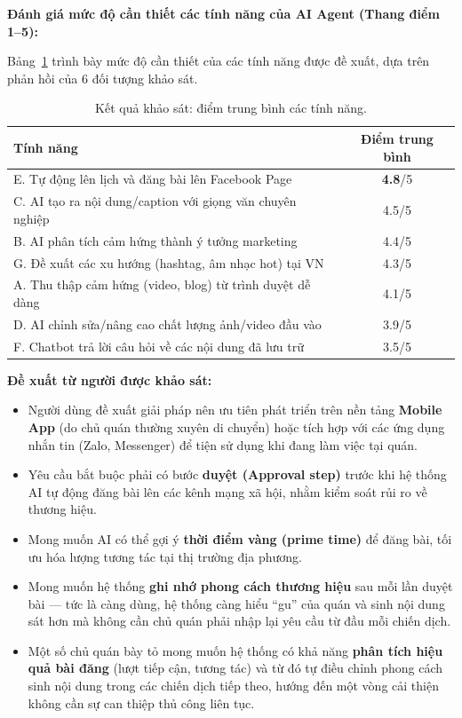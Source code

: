 \textbf{Đánh giá mức độ cần thiết các tính năng của AI Agent (Thang điểm
1--5):}

Bảng~\ref{tab:ket-qua-khao-sat} trình bày mức độ cần thiết của các tính
năng được đề xuất, dựa trên phản hồi của 6 đối tượng khảo sát.

\begin{table}[htbp]
\centering
\caption{Kết quả khảo sát: điểm trung bình các tính năng.}
\label{tab:ket-qua-khao-sat}
\small
\begin{tabular}{p{9.2cm} c}
\toprule
\textbf{Tính năng} & \textbf{Điểm trung bình} \\
\midrule
E. Tự động lên lịch và đăng bài lên Facebook Page & \textbf{4.8}/5 \\
C. AI tạo ra nội dung/caption với giọng văn chuyên nghiệp & 4.5/5 \\
B. AI phân tích cảm hứng thành ý tưởng marketing & 4.4/5 \\
G. Đề xuất các xu hướng (hashtag, âm nhạc hot) tại VN & 4.3/5 \\
A. Thu thập cảm hứng (video, blog) từ trình duyệt dễ dàng & 4.1/5 \\
D. AI chỉnh sửa/nâng cao chất lượng ảnh/video đầu vào & 3.9/5 \\
F. Chatbot trả lời câu hỏi về các nội dung đã lưu trữ & 3.5/5 \\
\bottomrule
\end{tabular}
\end{table}

\textbf{Đề xuất từ người được khảo sát:}

\begin{itemize}
\item
  Người dùng đề xuất giải pháp nên ưu tiên phát triển trên nền tảng
  \textbf{Mobile App} (do chủ quán thường xuyên di chuyển) hoặc tích hợp
  với các ứng dụng nhắn tin (Zalo, Messenger) để tiện sử dụng khi đang
  làm việc tại quán.
\item
  Yêu cầu bắt buộc phải có bước \textbf{duyệt (Approval step)} trước khi
  hệ thống AI tự động đăng bài lên các kênh mạng xã hội, nhằm kiểm soát
  rủi ro về thương hiệu.
\item
  Mong muốn AI có thể gợi ý \textbf{thời điểm vàng (prime time)} để đăng
  bài, tối ưu hóa lượng tương tác tại thị trường địa phương.
\item
  Mong muốn hệ thống \textbf{ghi nhớ phong cách thương hiệu} sau mỗi
  lần duyệt bài --- tức là càng dùng, hệ thống càng hiểu ``gu'' của
  quán và sinh nội dung sát hơn mà không cần chủ quán phải nhập lại
  yêu cầu từ đầu mỗi chiến dịch.
\item
  Một số chủ quán bày tỏ mong muốn hệ thống có khả năng \textbf{phân
  tích hiệu quả bài đăng} (lượt tiếp cận, tương tác) và từ đó tự
  điều chỉnh phong cách sinh nội dung trong các chiến dịch tiếp theo,
  hướng đến một vòng cải thiện không cần sự can thiệp thủ công liên tục.
\end{itemize}

